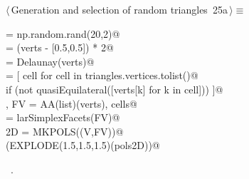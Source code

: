 \documentclass[11pt,oneside]{article}	%
\begin{document}
\begin{flushleft} \small
\begin{minipage}{\linewidth} \label{scrap61}
\protect{}$\langle\,$Generation and selection of random triangles\nobreak\ {\footnotesize 25a}$\,\rangle\equiv$
\vspace{-1ex}
\begin{list}{}{} \item
\mbox{}\verb@verts = np.random.rand(20,2)@\\
\mbox{}\verb@verts = (verts - [0.5,0.5]) * 2@\\
\mbox{}\verb@triangles = Delaunay(verts)@\\
\mbox{}\verb@cells = [ cell for cell in triangles.vertices.tolist()@\\
\mbox{}\verb@         if (not quasiEquilateral([verts[k] for k in cell])) ]@\\
\mbox{}\verb@V, FV = AA(list)(verts), cells@\\
\mbox{}\verb@EV = larSimplexFacets(FV)@\\
\mbox{}\verb@pols2D = MKPOLS((V,FV))@\\
\mbox{}\verb@VIEW(EXPLODE(1.5,1.5,1.5)(pols2D))@\\
\mbox{}\verb@@{\NWsep}
\end{list}
\vspace{-1ex}
\footnotesize\addtolength{\baselineskip}{-1ex}
\begin{list}{}{\setlength{\itemsep}{-\parsep}\setlength{\itemindent}{-\leftmargin}}
\item \NWtxtMacroRefIn\ .
\end{list}
\end{minipage}\\[4ex]
\end{flushleft}
\end{document}
